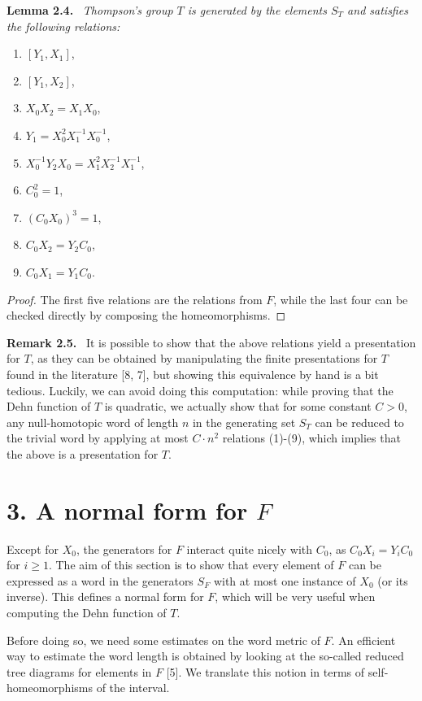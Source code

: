 \documentclass[10pt,a4paper]{article}
\newcommand{\sourcepagenumber}{editorial cover}
\newcommand{\SourcePage}[1]{\clearpage\gdef\sourcepagenumber{#1}}
\newenvironment{authorstatement}[1]{\par\medskip\noindent\textbf{#1}\ \itshape}{\par\medskip}
\newenvironment{authorremark}[1]{\par\medskip\noindent\textbf{#1}\ }{\par\medskip}
\begin{document}
\SourcePage{5}
\begin{authorstatement}{Lemma 2.4.}
Thompson's group $T$ is generated by the elements $S_T$ and satisfies the following relations:
\end{authorstatement}
\begin{enumerate}
\item $[Y_1,X_1]$,
\item $[Y_1,X_2]$,
\item $X_0X_2=X_1X_0$,
\item $Y_1=X_0^2X_1^{-1}X_0^{-1}$,
\item $X_0^{-1}Y_2X_0=X_1^2X_2^{-1}X_1^{-1}$,
\item $C_0^2=1$,
\item $(C_0X_0)^3=1$,
\item $C_0X_2=Y_2C_0$,
\item $C_0X_1=Y_1C_0$.
\end{enumerate}
\begin{proof}
The first five relations are the relations from $F$, while the last four can be checked directly by composing the homeomorphisms.
\end{proof}
\begin{authorremark}{Remark 2.5.}
It is possible to show that the above relations yield a presentation for $T$, as they can be obtained by manipulating the finite presentations for $T$ found in the literature [8, 7], but showing this equivalence by hand is a bit tedious. Luckily, we can avoid doing this computation: while proving that the Dehn function of $T$ is quadratic, we actually show that for some constant $C>0$, any null-homotopic word of length $n$ in the generating set $S_T$ can be reduced to the trivial word by applying at most $C\cdot n^2$ relations (1)-(9), which implies that the above is a presentation for $T$.
\end{authorremark}
\section*{3. A normal form for $F$}
Except for $X_0$, the generators for $F$ interact quite nicely with $C_0$, as $C_0X_i=Y_iC_0$ for $i\ge1$. The aim of this section is to show that every element of $F$ can be expressed as a word in the generators $S_F$ with at most one instance of $X_0$ (or its inverse). This defines a normal form for $F$, which will be very useful when computing the Dehn function of $T$.

Before doing so, we need some estimates on the word metric of $F$. An efficient way to estimate the word length is obtained by looking at the so-called reduced tree diagrams for elements in $F$ [5]. We translate this notion in terms of self-homeomorphisms of the interval.
\end{document}
